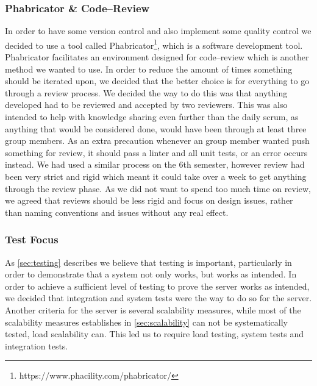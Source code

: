 \subsubsection{Phabricator \& Code--Review}
In order to have some version control and also implement some quality control we decided to use a tool called Phabricator\footnote{https://www.phacility.com/phabricator/}, which is a software development tool.
Phabricator facilitates an environment designed for code--review which is another method we wanted to use.
In order to reduce the amount of times something should be iterated upon, we decided that the better choice is for everything to go through a review process.
We decided the way to do this was that anything developed had to be reviewed and accepted by two reviewers.
This was also intended to help with knowledge sharing even further than the daily scrum, as anything that would be considered done, would have been through at least three group members.%
As an extra precaution whenever an group member wanted push something for review, it should pass a linter and all unit tests, or an error occurs instead.
We had used a similar process on the 6th semester, however review had been very strict and rigid which meant it could take over a week to get anything through the review phase.
As we did not want to spend too much time on review, we agreed that reviews should be less rigid and focus on design issues, rather than naming conventions and issues without any real effect.
\subsubsection{Test Focus}
As \cref{sec:testing} describes we believe that testing is important, particularly in order to demonstrate that a system not only works, but works as intended.
In order to achieve a sufficient level of testing to prove the server works as intended, we decided that integration and system tests were the way to do so for the server.
Another criteria for the server is several scalability measures, while most of the scalability measures establishes in \cref{sec:scalability} can not be systematically tested, load scalability can.
This led us to require load testing, system tests and integration tests.
